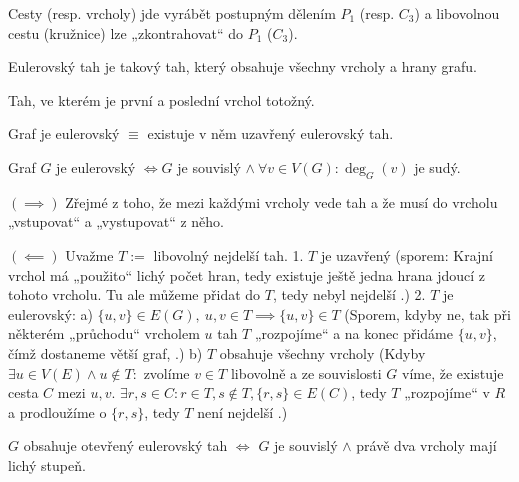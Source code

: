 \documentclass[12pt]{article}					%
\begin{document}
    \begin{poznamka}[Pozorování]
        Cesty (resp. vrcholy) jde vyrábět postupným dělením $P_1$ (resp. $C_3$) a libovolnou cestu (kružnice) lze „zkontrahovat“ do $P_1$ ($C_3$).
    \end{poznamka}


    \begin{definice}
        Eulerovský tah je takový tah, který obsahuje všechny vrcholy a hrany grafu.
    \end{definice}

    \begin{definice}
        Tah, ve kterém je první a poslední vrchol totožný.
    \end{definice}

    \begin{definice}
        Graf je eulerovský $≡$ existuje v něm uzavřený eulerovský tah.
    \end{definice}

    \begin{veta}
        Graf $G$ je eulerovský $\Leftrightarrow G$ je souvislý $\land\ \forall v \in V(G): \deg_G(v)$ je sudý.
        \begin{dukazin}
            $(\implies)$ Zřejmé z toho, že mezi každými vrcholy vede tah a že musí do vrcholu „vstupovat“ a „vystupovat“ z něho.

            $(\impliedby)$ Uvažme $T := $ libovolný nejdelší tah. 1. $T$ je uzavřený (sporem: Krajní vrchol má „použito“ lichý počet hran, tedy existuje ještě jedna hrana jdoucí z tohoto vrcholu. Tu ale můžeme přidat do $T$, tedy nebyl nejdelší \lightning.) 2. $T$ je eulerovský: a) $\{u, v\} \in E(G),\ u, v \in T \implies \{u, v\} \in T$ (Sporem, kdyby ne, tak při některém „průchodu“ vrcholem $u$ tah $T$ „rozpojíme“ a na konec přidáme $\{u, v\}$, čímž dostaneme větší graf, \lightning.) b) $T$ obsahuje všechny vrcholy (Kdyby $\exists u \in V(E) \land u \notin T:$ zvolíme $v \in T$ libovolně a ze souvislosti $G$ víme, že existuje cesta $C$ mezi $u, v$. $\exists r, s \in C: r\in T, s \notin T, \{r, s\}\in E(C)$, tedy $T$ „rozpojíme“ v $R$ a prodloužíme o $\{r, s\}$, tedy $T$ není nejdelší \lightning.)
        \end{dukazin}
    \end{veta}

    \begin{priklad}
        $G$ obsahuje otevřený eulerovský tah $\Leftrightarrow$ $G$ je souvislý $\land$ právě dva vrcholy mají lichý stupeň.
    \end{priklad}
\end{document}
